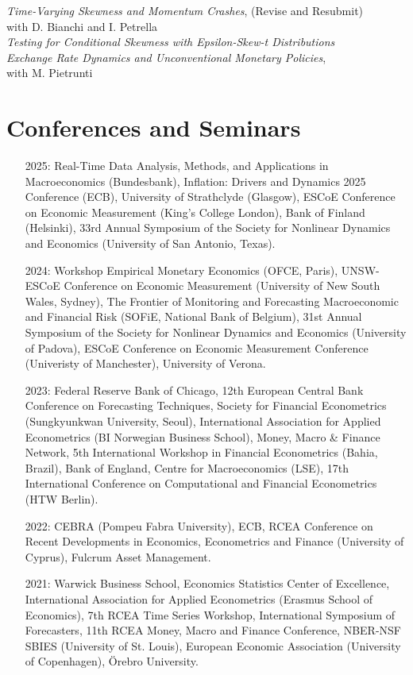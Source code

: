 \documentclass[a4paper,11pt]{article}
\begin{document}
\noindent \textit{Time-Varying Skewness and Momentum Crashes}, (Revise and Resubmit)\\
with D. Bianchi and I. Petrella \\

\noindent \textit{Testing for Conditional Skewness with Epsilon-Skew-t Distributions} \\

\noindent \textit{Exchange Rate Dynamics and Unconventional Monetary Policies},\\
with M. Pietrunti

\section{Conferences and Seminars} \begin{itemize}
    \item[2025:] Real-Time Data Analysis, Methods, and Applications in Macroeconomics (Bundesbank), Inflation: Drivers and Dynamics 2025 Conference (ECB), University of Strathclyde (Glasgow), ESCoE Conference on Economic Measurement (King's College London), Bank of Finland (Helsinki), 33rd Annual Symposium of the Society for Nonlinear Dynamics and Economics (University of San Antonio, Texas). 
    \item[2024:] Workshop Empirical Monetary Economics (OFCE, Paris), UNSW-ESCoE Conference on Economic Measurement (University of New South Wales, Sydney), The Frontier of Monitoring and Forecasting Macroeconomic and Financial Risk (SOFiE, National Bank of Belgium), 31st Annual Symposium of the Society for Nonlinear Dynamics and Economics (University of Padova), ESCoE Conference on Economic Measurement Conference (Univeristy of Manchester), University of Verona.
    \item[2023:] Federal Reserve Bank of Chicago, 12th European Central Bank Conference on Forecasting Techniques, Society for Financial Econometrics (Sungkyunkwan University, Seoul), International Association for Applied Econometrics (BI Norwegian Business School), Money, Macro \& Finance Network, 5th International Workshop in Financial Econometrics (Bahia, Brazil), Bank of England, Centre for Macroeconomics (LSE), 17th International Conference on Computational and Financial Econometrics (HTW Berlin). 
    \item[2022:] CEBRA (Pompeu Fabra University), ECB, RCEA Conference on Recent Developments in Economics, Econometrics and Finance (University of Cyprus), Fulcrum Asset Management.
    \item[2021:] Warwick Business School, Economics Statistics Center of Excellence, International Association for Applied Econometrics (Erasmus School of Economics), 7th RCEA Time Series Workshop, International Symposium of Forecasters, 11th RCEA Money, Macro and Finance Conference, NBER-NSF SBIES (University of St. Louis), European Economic Association (University of Copenhagen), \"Orebro University.

\end{itemize}
\end{document}
